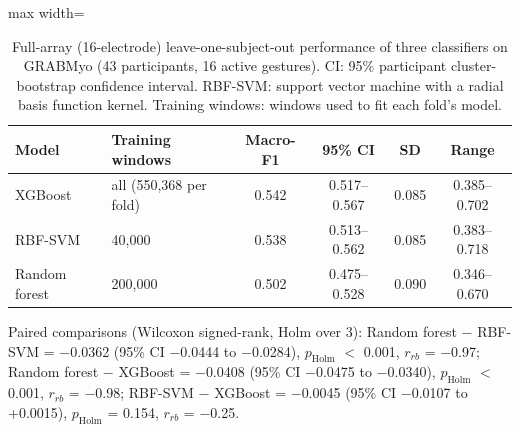 \begin{table}[htbp]
\centering
\small
\caption{Full-array (16-electrode) leave-one-subject-out performance of three classifiers on GRABMyo (43 participants, 16 active gestures). CI: 95\% participant cluster-bootstrap confidence interval. RBF-SVM: support vector machine with a radial basis function kernel. Training windows: windows used to fit each fold's model.}
\label{tab:full_channel}
\setlength{\tabcolsep}{4pt}
\begin{adjustbox}{max width=\textwidth}
\begin{tabular}{llcccc}
\toprule
Model & Training windows & Macro-F1 & 95\% CI & SD & Range \\
\midrule
XGBoost & all (550{,}368 per fold) & 0.542 & 0.517--0.567 & 0.085 & 0.385--0.702 \\
RBF-SVM & 40{,}000 & 0.538 & 0.513--0.562 & 0.085 & 0.383--0.718 \\
Random forest & 200{,}000 & 0.502 & 0.475--0.528 & 0.090 & 0.346--0.670 \\
\bottomrule
\end{tabular}
\end{adjustbox}
\par\smallskip\parbox{0.95\linewidth}{\footnotesize Paired comparisons (Wilcoxon signed-rank, Holm over 3): Random forest $-$ RBF-SVM = $-$0.0362 (95\% CI $-$0.0444 to $-$0.0284), $p_{\mathrm{Holm}}$ $<$ 0.001, $r_{rb}$ = $-$0.97; Random forest $-$ XGBoost = $-$0.0408 (95\% CI $-$0.0475 to $-$0.0340), $p_{\mathrm{Holm}}$ $<$ 0.001, $r_{rb}$ = $-$0.98; RBF-SVM $-$ XGBoost = $-$0.0045 (95\% CI $-$0.0107 to +0.0015), $p_{\mathrm{Holm}}$ = 0.154, $r_{rb}$ = $-$0.25.}
\end{table}
